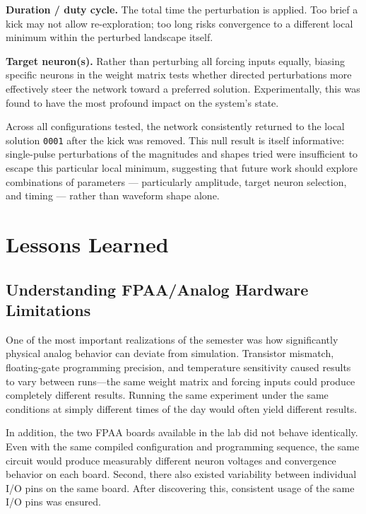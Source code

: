 \documentclass[12pt, letterpaper]{article}
\begin{document}
\textbf{Duration / duty cycle.} The total time the perturbation is applied. Too brief a
kick may not allow re-exploration; too long risks convergence to a different local
minimum within the perturbed landscape itself.

\textbf{Target neuron(s).} Rather than perturbing all forcing inputs equally, biasing
specific neurons in the weight matrix tests whether directed perturbations more
effectively steer the network toward a preferred solution. Experimentally, this was found
to have the most profound impact on the system's state.

Across all configurations tested, the network consistently returned to the local solution
\texttt{0001} after the kick was removed. This null result is itself informative:
single-pulse perturbations of the magnitudes and shapes tried were insufficient to escape
this particular local minimum, suggesting that future work should explore combinations
of parameters --- particularly amplitude, target neuron selection, and timing --- rather
than waveform shape alone.

\section{Lessons Learned}
\label{sec:lessons}

\subsection{Understanding FPAA/Analog Hardware Limitations}

One of the most important realizations of the semester was how significantly physical
analog behavior can deviate from simulation. Transistor mismatch, floating-gate programming
precision, and temperature sensitivity caused results to vary between runs---the same weight
matrix and forcing inputs could produce completely different results. Running the same experiment under the same conditions at simply different times of the day would often yield different results.

In addition, the two FPAA
boards available in the lab did not behave identically. Even with the same compiled
configuration and programming sequence, the same circuit would produce measurably
different neuron voltages and convergence behavior on each board. Second, there also existed variability between individual I/O pins on the same board.
After discovering this, consistent usage of the same I/O pins was ensured.
\end{document}
